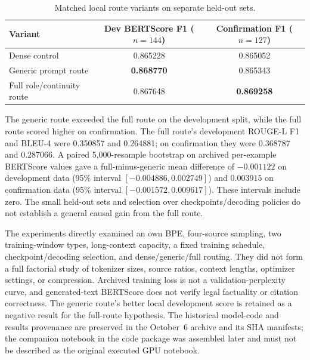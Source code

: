 \begin{table}[H]
\centering
\caption{Matched local route variants on separate held-out sets.}
\begin{tabular}{lcc}
\toprule
Variant & Dev BERTScore F1 ($n=144$) & Confirmation F1 ($n=127$) \\
\midrule
Dense control & 0.865228 & 0.865052 \\
Generic prompt route & \textbf{0.868770} & 0.865343 \\
Full role/continuity route & 0.867648 & \textbf{0.869258} \\
\bottomrule
\end{tabular}
\end{table}
The generic route exceeded the full route on the development split, while the
full route scored higher on confirmation. The full route's development
ROUGE-L F1 and BLEU-4 were 0.350857 and 0.264881; on confirmation they were
0.368787 and 0.287066. A paired 5,000-resample bootstrap on archived
per-example BERTScore values gave a full-minus-generic mean difference of
$-0.001122$ on development data (95\% interval $[-0.004886,0.002749]$) and
$0.003915$ on confirmation data (95\% interval
$[-0.001572,0.009617]$). These intervals include zero. The small held-out
sets and selection over checkpoints/decoding policies do not establish a
general causal gain from the full route.

The experiments directly examined an own BPE, four-source sampling,
two training-window types, long-context capacity, a fixed training schedule,
checkpoint/decoding selection, and dense/generic/full routing. They did not
form a full factorial study of tokenizer sizes, source ratios, context
lengths, optimizer settings, or compression. Archived training loss is not a
validation-perplexity curve, and generated-text BERTScore does not verify
legal factuality or citation correctness. The generic route's better local
development score is retained as a negative result for the full-route
hypothesis. The historical model-code and results provenance are preserved in
the October~6 archive and its SHA manifests; the companion notebook in the
code package was assembled later and must not be described as the original
executed GPU notebook.


